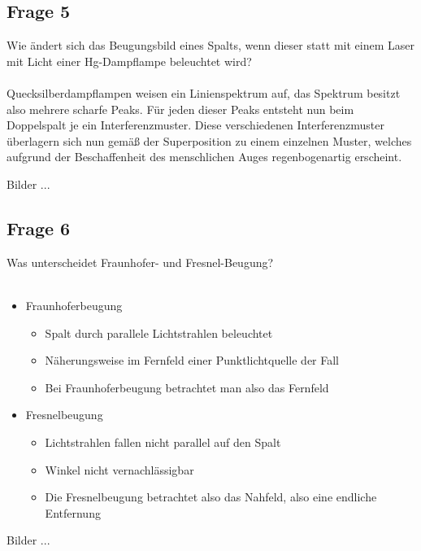 \documentclass[a4paper,10pt]{scrartcl}
\begin{document}
		\subsection{Frage 5}
		Wie ändert sich das Beugungsbild eines Spalts, wenn dieser statt mit einem Laser mit Licht
		einer Hg-Dampflampe beleuchtet wird?\\
		\\
		Quecksilberdampflampen weisen ein Linienspektrum auf, das Spektrum besitzt also mehrere scharfe Peaks. Für jeden dieser Peaks entsteht nun beim Doppelspalt je ein Interferenzmuster. Diese verschiedenen Interferenzmuster überlagern sich nun gemäß der Superposition zu einem einzelnen Muster, welches aufgrund der Beschaffenheit des menschlichen Auges regenbogenartig erscheint.
		
Bilder ...
		\subsection{Frage 6}
		Was unterscheidet Fraunhofer- und Fresnel-Beugung?\\
		\\
		\begin{itemize}
			\item Fraunhoferbeugung
			\begin{itemize}
				\item Spalt durch parallele Lichtstrahlen beleuchtet
				\item Näherungsweise im Fernfeld einer Punktlichtquelle der Fall
				\item Bei Fraunhoferbeugung betrachtet man also das Fernfeld
			\end{itemize}
			\item Fresnelbeugung
			\begin{itemize}
				\item Lichtstrahlen fallen nicht parallel auf den Spalt
				\item Winkel nicht vernachlässigbar
				\item Die Fresnelbeugung betrachtet also das Nahfeld, also eine endliche Entfernung
			\end{itemize}
		\end{itemize}

Bilder ...
			
\end{document}
